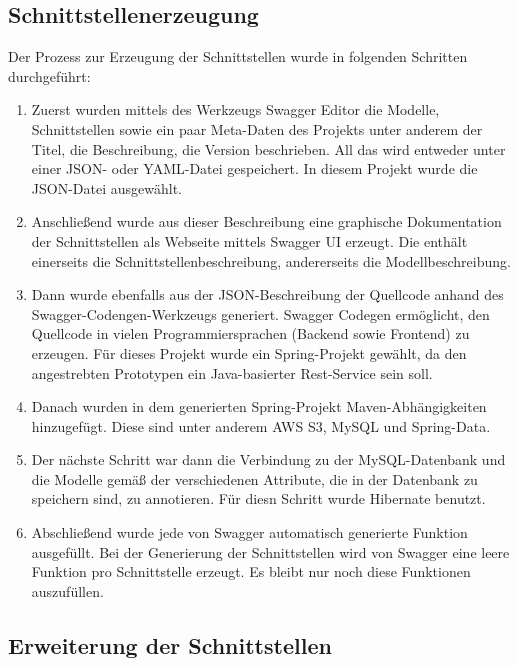 \documentclass[a4paper,twoside]{article}
\begin{document}
	\subsection{Schnittstellenerzeugung}
	
	Der Prozess zur Erzeugung der Schnittstellen wurde in folgenden Schritten durchgef\"uhrt:
	\begin{enumerate}
		\item Zuerst wurden mittels des Werkzeugs Swagger Editor die Modelle, Schnittstellen sowie ein paar Meta-Daten des Projekts unter anderem der Titel, die Beschreibung, die Version beschrieben. All das wird entweder unter einer JSON- oder YAML-Datei gespeichert. In diesem Projekt wurde die JSON-Datei ausgew\"ahlt.
		
		\item Anschlie\ss{}end wurde aus dieser Beschreibung eine graphische Dokumentation der Schnittstellen als Webseite mittels Swagger UI erzeugt. Die enth\"alt einerseits die Schnittstellenbeschreibung, andererseits die Modellbeschreibung.
		
		\item Dann wurde ebenfalls aus der JSON-Beschreibung der Quellcode anhand des Swagger-Codengen-Werkzeugs generiert. Swagger Codegen erm\"oglicht, den Quellcode in vielen Programmiersprachen (Backend sowie Frontend) zu erzeugen. F\"ur dieses Projekt wurde ein Spring-Projekt gew\"ahlt, da den angestrebten Prototypen ein Java-basierter Rest-Service sein soll.
		
		\item Danach wurden in dem generierten Spring-Projekt Maven-Abh\"angigkeiten hinzugef\"ugt. Diese sind unter anderem AWS S3, MySQL und Spring-Data.
		
		\item Der n\"achste Schritt war dann die Verbindung zu der MySQL-Datenbank und die Modelle gem\"a\ss{} der verschiedenen Attribute, die in der Datenbank zu speichern sind, zu annotieren. F\"ur diesn Schritt wurde Hibernate benutzt.
		
		\item Abschlie\ss{}end wurde jede von Swagger automatisch generierte Funktion ausgef\"ullt. Bei der Generierung der Schnittstellen wird von Swagger eine leere Funktion pro Schnittstelle erzeugt. Es bleibt nur noch diese Funktionen auszuf\"ullen.
	\end{enumerate}
	
	\subsection{Erweiterung der Schnittstellen}
	
\end{document}
